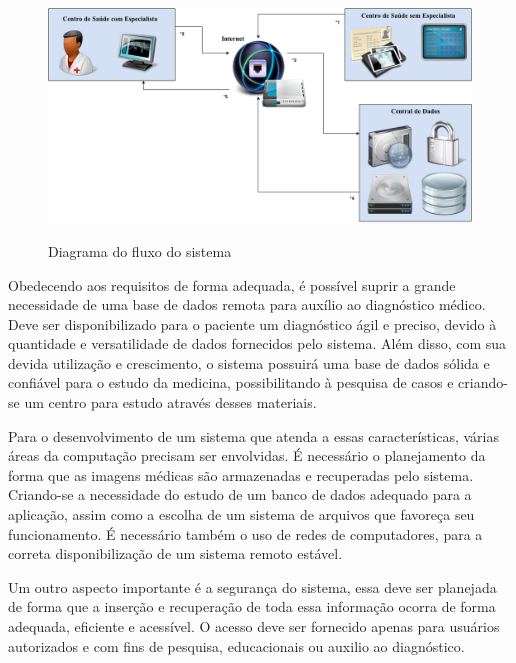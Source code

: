 \begin{figure}[ht]
	\centering	
	\caption[\hspace{0.1cm}Diagrama da Arquitetura.]{Diagrama do fluxo do sistema}
	\vspace{-0.4cm}
	\includegraphics[width=.8\textwidth]{figuras/diagramas/remoto.png}
	\vspace{-0.2cm}
	\label{fig:figura1}
\end{figure}

Obedecendo aos requisitos de forma adequada, é possível suprir a grande necessidade de uma base de dados remota para auxílio ao diagnóstico médico.
Deve ser disponibilizado para o paciente um diagnóstico ágil e preciso, devido à quantidade e versatilidade de dados fornecidos pelo sistema.
Além disso, com sua devida utilização e crescimento, o sistema possuirá uma base de dados sólida e confiável para o estudo da medicina, possibilitando à pesquisa de casos e criando-se um centro para estudo através desses materiais.

Para o desenvolvimento de um sistema que atenda a essas características, várias áreas da computação precisam ser envolvidas.
É necessário o planejamento da forma que as imagens médicas são armazenadas e recuperadas pelo sistema.
Criando-se a necessidade do estudo de um banco de dados adequado para a aplicação, assim como a escolha de um sistema de arquivos que favoreça seu funcionamento.
É necessário também o uso de redes de computadores, para a correta disponibilização de um sistema remoto estável.

Um outro aspecto importante é a segurança do sistema, essa deve ser planejada de forma que a inserção e recuperação de toda essa informação ocorra de forma adequada, eficiente e acessível.
O acesso deve ser fornecido apenas para usuários autorizados e com fins de pesquisa, educacionais ou auxilio ao diagnóstico.

